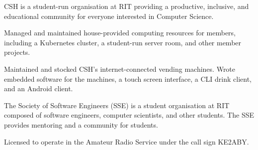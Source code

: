 \smallskip


\medskip


\smallskip
\smallskip


\medskip
{}

CSH is a student-run organisation at RIT providing a productive, inclusive, and educational community for everyone interested in Computer Science.

\medskip

Managed and maintained house-provided computing resources for members, including a Kubernetes cluster, a student-run server room, and other member projects.

\medskip

Maintained and stocked CSH's internet-connected vending machines.
Wrote embedded software for the machines, a touch screen interface, a CLI drink client, and an Android client.

\divider

The Society of Software Engineers (SSE) is a student organisation at RIT composed of software engineers, computer scientists, and other students. The SSE provides mentoring and a community for students.

\divider

Licensed to operate in the Amateur Radio Service under the call sign KE2ABY.
